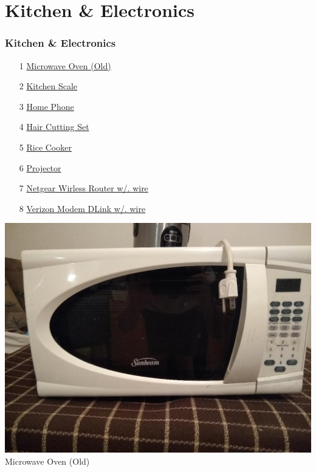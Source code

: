 \documentclass[t]{beamer}
\newcommand{\hlink}[2]{\hyperlink{#1}{#2}}
\newcommand{\htarget}[2]{\hypertarget{#1}{#2}}
\begin{document}
\section{Kitchen \& Electronics}
\begin{frame}[allowframebreaks]
\frametitle{Kitchen \& Electronics}
\begin{enumerate}
\item[1] \hlink{oven}{Microwave Oven (Old)}
\item[2] \hlink{scale}{Kitchen Scale}
\item[3] \hlink{phone}{Home Phone}
\item[4] \hlink{hair}{Hair Cutting Set}
\item[5] \hlink{rice}{Rice Cooker}
\item[6] \hlink{projector}{Projector}
\item[7] \hlink{netgear}{Netgear Wirless Router w/. wire}
\item[8] \hlink{verizon}{Verizon Modem DLink w/. wire}
\end{enumerate}
\end{frame}
\begin{frame}\htarget{oven}{} \begin{center}
\includegraphics[height=0.8\textheight]{microwave_oven_mini.jpg} \\
Microwave Oven (Old)
\end{center} \end{frame}
\end{document}
